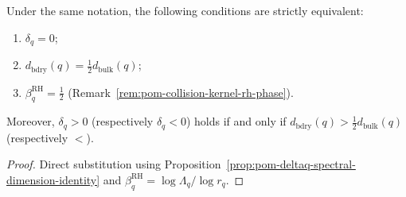 \begin{corollary}\label{cor:pom-deltaq-half-threshold-criterion}
Under the same notation, the following conditions are strictly equivalent:
\begin{enumerate}
  \item \(\delta_q=0\);
  \item \(d_{\mathrm{bdry}}(q)=\tfrac12 d_{\mathrm{bulk}}(q)\);
  \item \(\beta^{\mathrm{RH}}_q=\tfrac12\) (Remark~\ref{rem:pom-collision-kernel-rh-phase}).
\end{enumerate}
Moreover, \(\delta_q>0\) (respectively \(\delta_q<0\)) holds if and only if
\(
d_{\mathrm{bdry}}(q)>\tfrac12 d_{\mathrm{bulk}}(q)
\)
(respectively \(<\)).
\end{corollary}
\begin{proof}
Direct substitution using Proposition~\ref{prop:pom-deltaq-spectral-dimension-identity} and \(\beta^{\mathrm{RH}}_q=\log\Lambda_q/\log r_q\).
\end{proof}



